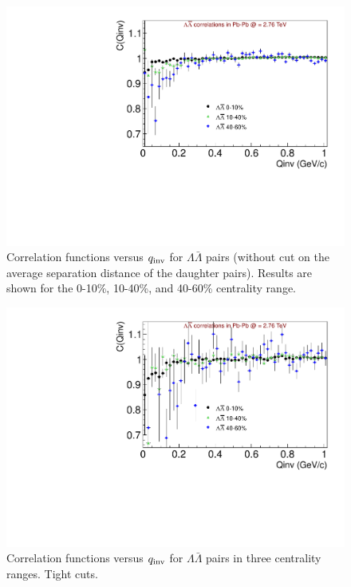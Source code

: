 {\begin{figure}[hbtp]
\includegraphics[scale=0.7]{MixCFs_No_MergeCut.pdf}
\caption[Correlation functions versus $q_{\rm inv}$ for $\Lambda\bar{\Lambda}$ pairs in three centrality ranges. No merging cuts]{Correlation functions versus $q_{\rm inv}$ for $\Lambda\bar{\Lambda}$ pairs (without cut on the average separation distance of the daughter pairs).  Results are shown for the 0-10\%, 10-40\%, and 40-60\% centrality range.}
\label{fig:CFNoMergeMix}
\end{figure}

\begin{figure}[hbtp]
\includegraphics[scale=0.7]{Mix_Tight_cuts_ANote.pdf}
\caption{Correlation functions versus $q_{\rm inv}$ for $\Lambda\bar{\Lambda}$ pairs in three centrality ranges. Tight cuts.}
\label{fig:CFTightCutsMix}
\end{figure}

}
